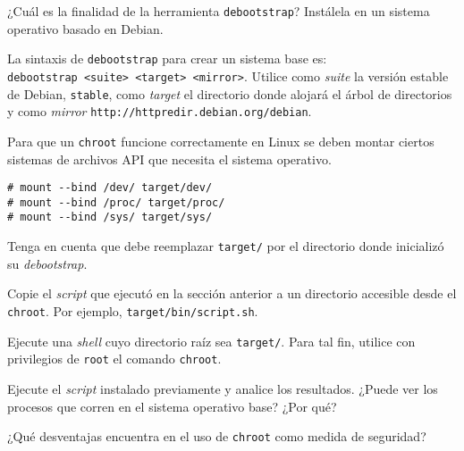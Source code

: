 \begin{questions}
  \question ¿Cuál es la finalidad de la herramienta \texttt{debootstrap}?
  Instálela en un sistema operativo basado en Debian.

  \question La sintaxis de \texttt{debootstrap} para crear un sistema base
  es: \texttt{debootstrap\ <suite>\ <target>\ <mirror>}. Utilice como
  \textit{suite} la versión estable de Debian, \texttt{stable}, como
  \textit{target} el directorio donde alojará el árbol de directorios y
  como \textit{mirror} \texttt{http://httpredir.debian.org/debian}.

  \question Para que un \texttt{chroot} funcione correctamente en Linux se
  deben montar ciertos sistemas de archivos API que necesita el sistema
  operativo.
\begin{verbatim}
# mount --bind /dev/ target/dev/
# mount --bind /proc/ target/proc/
# mount --bind /sys/ target/sys/
\end{verbatim}

  Tenga en cuenta que debe reemplazar \texttt{target/} por el directorio
  donde inicializó su \textit{debootstrap}.

  \question Copie el \textit{script} que ejecutó en la sección anterior a
  un directorio accesible desde el \texttt{chroot}. Por ejemplo,
  \texttt{target/bin/script.sh}.

  \question Ejecute una \textit{shell} cuyo directorio raíz sea
  \texttt{target/}. Para tal fin, utilice con privilegios de \texttt{root}
  el comando \texttt{chroot}.

  \question Ejecute el \textit{script} instalado previamente y analice los
  resultados. ¿Puede ver los procesos que corren en el sistema operativo
  base? ¿Por qué?

  \question ¿Qué desventajas encuentra en el uso de \texttt{chroot} como
  medida de seguridad?

\end{questions}

